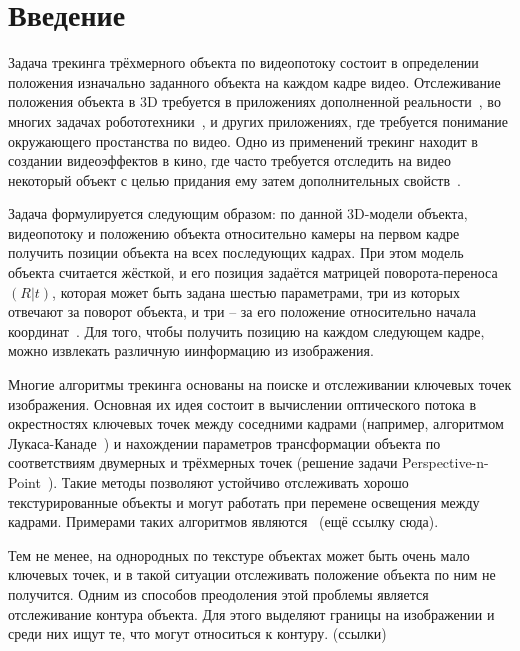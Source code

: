 \section{Введение}


Задача трекинга трёхмерного объекта по видеопотоку состоит в определении
положения изначально заданного объекта на каждом кадре видео.
Отслеживание положения объекта в 3D требуется в приложениях дополненной
реальности~\cite{Radkowski}, во многих задачах робототехники~\cite{Robotics}, и
других приложениях, где требуется понимание окружающего простанства по видео.
Одно из применений трекинг находит в создании видеоэффектов в кино, где часто
требуется отследить на видео некоторый объект с целью придания ему затем
дополнительных свойств~\cite{Bugaev_2018_ECCV}.

Задача формулируется следующим образом: по данной 3D-модели объекта,
видеопотоку и положению объекта относительно камеры на первом кадре получить
позиции объекта на всех последующих кадрах.
При этом модель объекта считается жёсткой, и его позиция задаётся матрицей
поворота-переноса $(R | t)$, которая может быть задана шестью параметрами, три
из которых отвечают за поворот объекта, и три -- за его положение относительно
начала координат~\cite{TeorMech}.
Для того, чтобы получить позицию на каждом следующем кадре, можно извлекать
различную иинформацию из изображения.

Многие алгоритмы трекинга основаны на поиске и отслеживании ключевых точек
изображения.
Основная их идея состоит в вычислении оптического потока в окрестностях
ключевых точек между соседними кадрами (например, алгоритмом
Лукаса-Канаде~\cite{LukasKanade}) и нахождении параметров трансформации объекта
по соответствиям двумерных и трёхмерных точек (решение задачи
Perspective-n-Point~\cite{PnPRansac}).
Такие методы позволяют устойчиво отслеживать хорошо текстурированные объекты и
могут работать при перемене освещения между кадрами.
Примерами таких алгоритмов являются~\cite{LourakisFeatures} (ещё ссылку сюда). 

Тем не менее, на однородных по текстуре объектах может быть очень мало ключевых
точек, и в такой ситуации отслеживать положение объекта по ним не получится.
Одним из способов преодоления этой проблемы является отслеживание контура
объекта.
Для этого выделяют границы на изображении и среди них ищут те, что могут
относиться к контуру. (ссылки)

